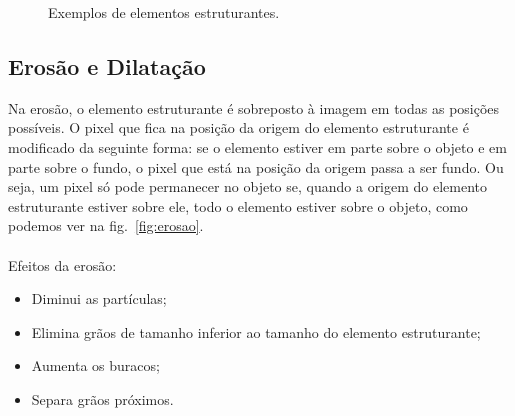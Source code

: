 \begin{figure}[ht]
 \begin{center}
  \hspace{1.5cm}
  \hspace{1.5cm}
 \end{center}
 \caption{Exemplos de elementos estruturantes.}
 \label{fig:elemento_estruturante}
\end{figure}

\subsection{Erosão e Dilatação}

Na erosão, o elemento estruturante é sobreposto à imagem em todas as posições possíveis. O pixel que fica na posição da origem do elemento estruturante é modificado da seguinte forma: se o elemento estiver em parte sobre o objeto e em parte sobre o fundo, o pixel que está na posição da origem passa a ser fundo. Ou seja, um pixel só pode permanecer no objeto se, quando a origem do elemento estruturante estiver sobre ele, todo o elemento estiver sobre o objeto, como podemos ver na fig.~\ref{fig:erosao}.
\\ \\
Efeitos da erosão:

\begin{itemize}
 \item Diminui as partículas;
 \item Elimina grãos de tamanho inferior ao tamanho do elemento estruturante;
 \item Aumenta os buracos;
 \item Separa grãos próximos.
\end{itemize}


